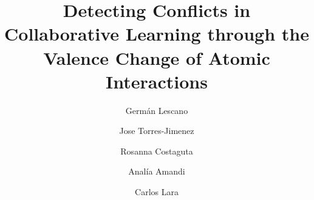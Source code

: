 \documentclass[3p,times,preprint]{elsarticle}
\begin{document}
\begin{frontmatter}




\author[santiago]{Germ\'an Lescano}

\address[santiago]{Instituto de Investigaci\'on en Inform\'atica y Sistemas de Informaci\'on \\Universidad Nacional de Santiago del Estero. Argentina}


\author[cinves]{Jose Torres-Jimenez}
\address[cinves]{Cinvestav Unidad Tamaulipas, Tamaulipas, M\'exico}


\author[santiago]{Rosanna Costaguta}

\author[conicet]{Anal\'ia Amandi}
\address[conicet]{N\'ucleo de Inteligencia Comportamental Empresarial, CONICET-UNICEN, Argentina}




\author[cimat]{Carlos Lara}
\address[cimat]{Centro de Investigaci\'on en Matem\'aticas, A.C., M\'exico}




 
 
 



\title{Detecting Conflicts in Collaborative Learning through the Valence Change of Atomic Interactions}



\end{frontmatter}
\end{document}
